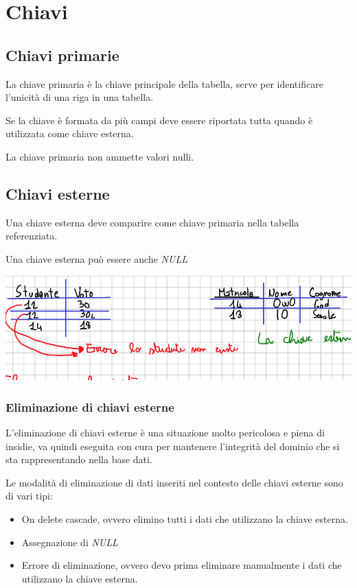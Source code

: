 \chapter{Chiavi} \label{chap:chiavi}

\section{Chiavi primarie}
La chiave primaria è la chiave principale della tabella, serve per identificare l'unicità di una riga in una tabella.

Se la chiave è formata da più campi deve essere riportata tutta quando è utilizzata come chiave esterna.

La chiave primaria non ammette valori nulli.

\section{Chiavi esterne}
Una chiave esterna deve comparire come chiave primaria nella tabella referenziata.

Una chiave esterna può essere anche \textit{NULL}

\includegraphics[width=\textwidth]{img/chiave_esterna.png}

\subsection{Eliminazione di chiavi esterne}

L'eliminazione di chiavi esterne è una situazione molto pericolosa e piena di insidie, va quindi eseguita con cura per mantenere l'integrità del dominio che si sta rappresentando nella base dati.

Le modalità di eliminazione di dati inseriti nel contesto delle chiavi esterne sono di vari tipi:

\begin{itemize}
    \item On delete cascade, ovvero elimino tutti i dati che utilizzano la chiave esterna.
    \item Assegnazione di \textit{NULL}
    \item Errore di eliminazione, ovvero devo prima eliminare manualmente i dati che utilizzano la chiave esterna.
\end{itemize}


